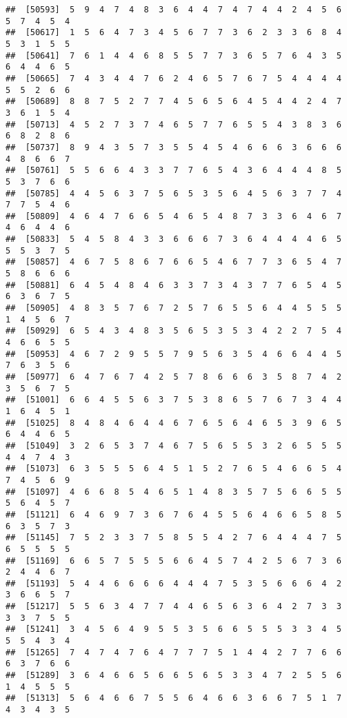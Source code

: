 \documentclass[
]{book}
\begin{document}
\begin{verbatim}
##  [50593]  5  9  4  7  4  8  3  6  4  4  7  4  7  4  4  2  4  5  6  5  7  4  5  4
##  [50617]  1  5  6  4  7  3  4  5  6  7  7  3  6  2  3  3  6  8  4  5  3  1  5  5
##  [50641]  7  6  1  4  4  6  8  5  5  7  7  3  6  5  7  6  4  3  5  6  4  4  6  5
##  [50665]  7  4  3  4  4  7  6  2  4  6  5  7  6  7  5  4  4  4  4  5  5  2  6  6
##  [50689]  8  8  7  5  2  7  7  4  5  6  5  6  4  5  4  4  2  4  7  3  6  1  5  4
##  [50713]  4  5  2  7  3  7  4  6  5  7  7  6  5  5  4  3  8  3  6  6  8  2  8  6
##  [50737]  8  9  4  3  5  7  3  5  5  4  5  4  6  6  6  3  6  6  6  4  8  6  6  7
##  [50761]  5  5  6  6  4  3  3  7  7  6  5  4  3  6  4  4  4  8  5  5  3  7  6  6
##  [50785]  4  4  5  6  3  7  5  6  5  3  5  6  4  5  6  3  7  7  4  7  7  5  4  6
##  [50809]  4  6  4  7  6  6  5  4  6  5  4  8  7  3  3  6  4  6  7  4  6  4  4  6
##  [50833]  5  4  5  8  4  3  3  6  6  6  7  3  6  4  4  4  4  6  5  5  5  3  7  5
##  [50857]  4  6  7  5  8  6  7  6  6  5  4  6  7  7  3  6  5  4  7  5  8  6  6  6
##  [50881]  6  4  5  4  8  4  6  3  3  7  3  4  3  7  7  6  5  4  5  6  3  6  7  5
##  [50905]  4  8  3  5  7  6  7  2  5  7  6  5  5  6  4  4  5  5  5  1  4  5  6  7
##  [50929]  6  5  4  3  4  8  3  5  6  5  3  5  3  4  2  2  7  5  4  4  6  6  5  5
##  [50953]  4  6  7  2  9  5  5  7  9  5  6  3  5  4  6  6  4  4  5  7  6  3  5  6
##  [50977]  6  4  7  6  7  4  2  5  7  8  6  6  6  3  5  8  7  4  2  3  5  6  7  5
##  [51001]  6  6  4  5  5  6  3  7  5  3  8  6  5  7  6  7  3  4  4  1  6  4  5  1
##  [51025]  8  4  8  4  6  4  4  6  7  6  5  6  4  6  5  3  9  6  5  6  4  4  6  5
##  [51049]  3  2  6  5  3  7  4  6  7  5  6  5  5  3  2  6  5  5  5  4  4  7  4  3
##  [51073]  6  3  5  5  5  6  4  5  1  5  2  7  6  5  4  6  6  5  4  7  4  5  6  9
##  [51097]  4  6  6  8  5  4  6  5  1  4  8  3  5  7  5  6  6  5  5  5  6  4  5  7
##  [51121]  6  4  6  9  7  3  6  7  6  4  5  5  6  4  6  6  5  8  5  6  3  5  7  3
##  [51145]  7  5  2  3  3  7  5  8  5  5  4  2  7  6  4  4  4  7  5  6  5  5  5  5
##  [51169]  6  6  5  7  5  5  5  6  6  4  5  7  4  2  5  6  7  3  6  2  4  4  6  7
##  [51193]  5  4  4  6  6  6  6  4  4  4  7  5  3  5  6  6  6  4  2  3  6  6  5  7
##  [51217]  5  5  6  3  4  7  7  4  4  6  5  6  3  6  4  2  7  3  3  3  3  7  5  5
##  [51241]  3  4  5  6  4  9  5  5  3  5  6  6  5  5  5  3  3  4  5  5  5  4  3  4
##  [51265]  7  4  7  4  7  6  4  7  7  7  5  1  4  4  2  7  7  6  6  6  3  7  6  6
##  [51289]  3  6  4  6  6  5  6  6  5  6  5  3  3  4  7  2  5  5  6  1  4  5  5  5
##  [51313]  5  6  4  6  6  7  5  5  6  4  6  6  3  6  6  7  5  1  7  4  3  4  3  5

\end{verbatim}
\end{document}
